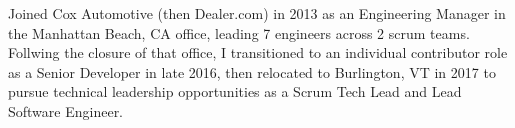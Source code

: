 

\begin{cvparagraph}
Joined Cox Automotive (then Dealer.com) in 2013 as an Engineering Manager in the Manhattan Beach, CA office,
leading 7 engineers across 2 scrum teams. Follwing the closure of that office, I transitioned to an individual
contributor role as a Senior Developer in late 2016, then relocated to Burlington, VT in 2017 to pursue
technical leadership opportunities as a Scrum Tech Lead and Lead Software Engineer.
\end{cvparagraph}


